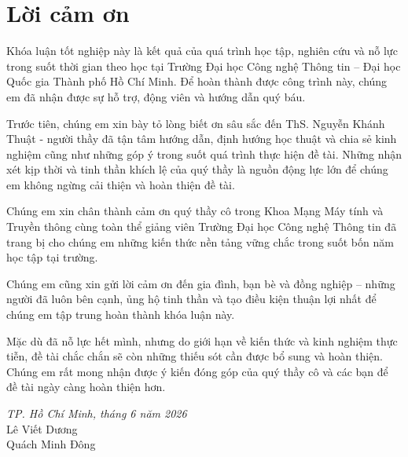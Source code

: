 \chapter*{Lời cảm ơn}

Khóa luận tốt nghiệp này là kết quả của quá trình học tập, nghiên cứu và nỗ lực trong suốt thời gian theo học tại Trường Đại học Công nghệ Thông tin – Đại học Quốc gia Thành phố Hồ Chí Minh. Để hoàn thành được công trình này, chúng em đã nhận được sự hỗ trợ, động viên và hướng dẫn quý báu.

Trước tiên, chúng em xin bày tỏ lòng biết ơn sâu sắc đến ThS. Nguyễn Khánh Thuật - người thầy đã tận tâm hướng dẫn, định hướng học thuật và chia sẻ kinh nghiệm cũng như những góp ý trong suốt quá trình thực hiện đề tài. Những nhận xét kịp thời và tinh thần khích lệ của quý thầy là nguồn động lực lớn để chúng em không ngừng cải thiện và hoàn thiện đề tài.

Chúng em xin chân thành cảm ơn quý thầy cô trong Khoa Mạng Máy tính và Truyền thông cùng toàn thể giảng viên Trường Đại học Công nghệ Thông tin đã trang bị cho chúng em những kiến thức nền tảng vững chắc trong suốt bốn năm học tập tại trường.

Chúng em cũng xin gửi lời cảm ơn đến gia đình, bạn bè và đồng nghiệp – những người đã luôn bên cạnh, ủng hộ tinh thần và tạo điều kiện thuận lợi nhất để chúng em tập trung hoàn thành khóa luận này.

Mặc dù đã nỗ lực hết mình, nhưng do giới hạn về kiến thức và kinh nghiệm thực tiễn, đề tài chắc chắn sẽ còn những thiếu sót cần được bổ sung và hoàn thiện. Chúng em rất mong nhận được ý kiến đóng góp của quý thầy cô và các bạn để đề tài ngày càng hoàn thiện hơn.

\vspace{1cm}
\begin{flushright}
\textit{TP. Hồ Chí Minh, tháng 6 năm 2026}\\[0.5cm]
Lê Viết Dương \\
Quách Minh Đông
\end{flushright}
